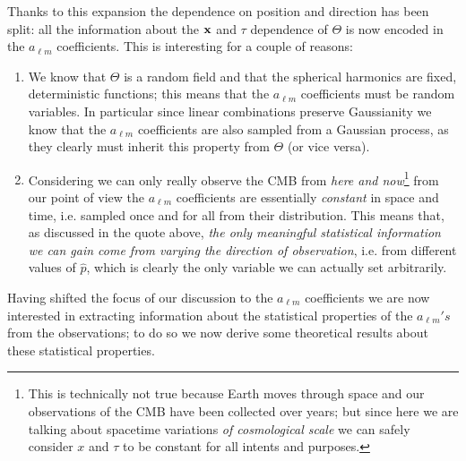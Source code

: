 Thanks to this expansion the dependence on position and direction has been split: all the information about the $\vb{x}$ and $\tau$ dependence of $\Theta$ is now encoded in the $a_{\ell m}$ coefficients. This is interesting for a couple of reasons:
\begin{enumerate}
    \item We know that $\Theta$ is a random field and that the spherical harmonics are fixed, deterministic functions; this means that the $a_{\ell m}$ coefficients must be random variables. In particular since linear combinations preserve Gaussianity we know that the $a_{\ell m}$ coefficients are also sampled from a Gaussian process, as they clearly must inherit this property from $\Theta$ (or vice versa).
    \item %
    Considering we can only really observe the CMB from \emph{here and now}\footnote{This is technically not true because Earth moves through space and our observations of the CMB have been collected over years; but since here we are talking about spacetime variations \emph{of cosmological scale} we can safely consider $x$ and $\tau$ to be constant for all intents and purposes.} from our point of view the $a_{\ell m}$ coefficients are essentially \emph{constant} in space and time, i.e. sampled once and for all from their distribution. This means that, as discussed in the quote above, \emph{the only meaningful statistical information we can gain come from varying the direction of observation}, i.e. from different values of $\hat{p}$, which is clearly the only variable we can actually set arbitrarily.
\end{enumerate}
Having shifted the focus of our discussion to the $a_{\ell m}$ coefficients we are now interested in extracting information about the statistical properties of the $a_{\ell m}'s$ from the observations; to do so we now derive some theoretical results about these statistical properties.

